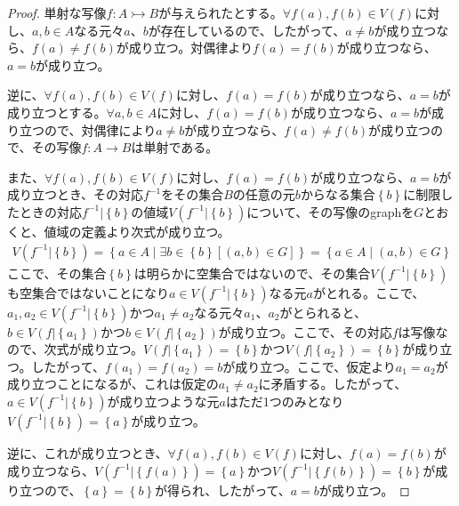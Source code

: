 \documentclass[dvipdfmx]{jsarticle}
\begin{document}
\begin{proof}
単射な写像$f:A \rightarrowtail B$が与えられたとする。$\forall f(a),f(b) \in V(f)$に対し、$a,b \in A$なる元々$a$、$b$が存在しているので、したがって、$a \neq b$が成り立つなら、$f(a) \neq f(b)$が成り立つ。対偶律より$f(a) = f(b)$が成り立つなら、$a = b$が成り立つ。\par
逆に、$\forall f(a),f(b) \in V(f)$に対し、$f(a) = f(b)$が成り立つなら、$a = b$が成り立つとする。$\forall a,b \in A$に対し、$f(a) = f(b)$が成り立つなら、$a = b$が成り立つので、対偶律により$a \neq b$が成り立つなら、$f(a) \neq f(b)$が成り立つので、その写像$f:A \rightarrow B$は単射である。\par
また、$\forall f(a),f(b) \in V(f)$に対し、$f(a) = f(b)$が成り立つなら、$a = b$が成り立つとき、その対応$f^{- 1}$をその集合$B$の任意の元$b$からなる集合$\left\{ b \right\}$に制限したときの対応$f^{- 1}|\left\{ b \right\}$の値域$V\left( f^{- 1}|\left\{ b \right\} \right)$について、その写像のgraphを$G$とおくと、値域の定義より次式が成り立つ。
\begin{align*}
V\left( f^{- 1}|\left\{ b \right\} \right) = \left\{ a \in A \middle| \exists b \in \left\{ b \right\}\left[ (a,b) \in G \right] \right\} = \left\{ a \in A \middle| (a,b) \in G \right\}
\end{align*}
ここで、その集合$\left\{ b \right\}$は明らかに空集合ではないので、その集合$V\left( f^{- 1}|\left\{ b \right\} \right)$も空集合ではないことになり$a \in V\left( f^{- 1}|\left\{ b \right\} \right)$なる元$a$がとれる。ここで、$a_{1},a_{2} \in V\left( f^{- 1}|\left\{ b \right\} \right)$かつ$a_{1} \neq a_{2}$なる元々$a_{1}$、$a_{2}$がとられると、$b \in V\left( f|\left\{ a_{1} \right\} \right)$かつ$b \in V\left( f|\left\{ a_{2} \right\} \right)$が成り立つ。ここで、その対応$f$は写像なので、次式が成り立つ。$V\left( f|\left\{ a_{1} \right\} \right) = \left\{ b \right\}$かつ$V\left( f|\left\{ a_{2} \right\} \right) = \left\{ b \right\}$が成り立つ。したがって、$f\left( a_{1} \right) = f\left( a_{2} \right) = b$が成り立つ。ここで、仮定より$a_{1} = a_{2}$が成り立つことになるが、これは仮定の$a_{1} \neq a_{2}$に矛盾する。したがって、$a \in V\left( f^{- 1}|\left\{ b \right\} \right)$が成り立つような元$a$はただ1つのみとなり$V\left( f^{- 1}|\left\{ b \right\} \right) = \left\{ a \right\}$が成り立つ。\par
逆に、これが成り立つとき、$\forall f(a),f(b) \in V(f)$に対し、$f(a) = f(b)$が成り立つなら、$V\left( f^{- 1}|\left\{ f(a) \right\} \right) = \left\{ a \right\}$かつ$V\left( f^{- 1}|\left\{ f(b) \right\} \right) = \left\{ b \right\}$が成り立つので、$\left\{ a \right\} = \left\{ b \right\}$が得られ、したがって、$a = b$が成り立つ。
\end{proof}
\end{document}
